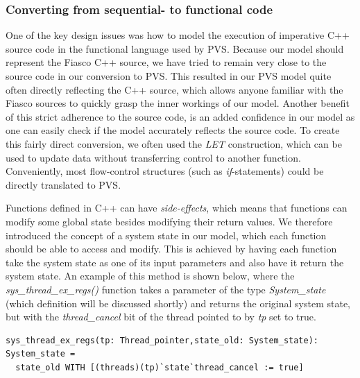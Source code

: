 \subsubsection{Converting from sequential- to functional code}
One of the key design issues was how to model the execution of imperative C++ source code in the functional language used by PVS. Because our model should represent the Fiasco C++ source, we have tried to remain very close to the source code in our conversion to PVS. This resulted in our PVS model quite often directly reflecting the C++ source, which allows anyone familiar with the Fiasco sources to quickly grasp the inner workings of our model. Another benefit of this strict adherence to the source code, is an added confidence in our model as one can easily check if the model accurately reflects the source code. To create this fairly direct conversion, we often used the \emph{LET} construction, which can be used to update data without transferring control to another function. Conveniently, most flow-control structures (such as \emph{if}-statements) could be directly translated to PVS.\emptyline

Functions defined in C++ can have \emph{side-effects}, which means that functions can modify some global state besides modifying their return values. We therefore introduced the concept of a system state in our model, which each function should be able to access and modify. This is achieved by having each function take the system state as one of its input parameters and also have it return the system state. An example of this method is shown below, where the \emph{sys\_thread\_ex\_regs()} function takes a parameter of the type \emph{System\_state} (which definition will be discussed shortly) and returns the original system state, but with the \emph{thread\_cancel} bit of the thread pointed to by \emph{tp} set to true.

\lstset{language=PVS}
\begin{lstlisting}[caption={PVS: an example of a system state-modifying function.}]
sys_thread_ex_regs(tp: Thread_pointer,state_old: System_state): System_state =
  state_old WITH [(threads)(tp)`state`thread_cancel := true]
\end{lstlisting}

